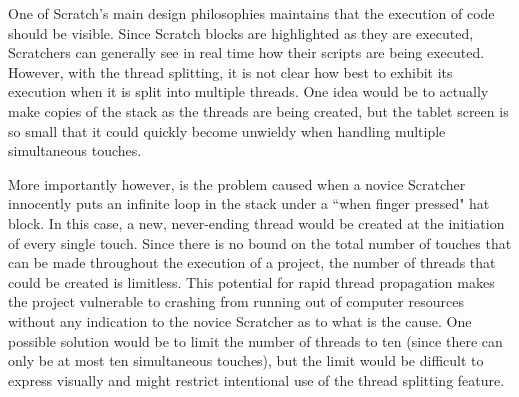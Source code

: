 One of Scratch's main design philosophies maintains that the execution of code should be visible. Since Scratch blocks are highlighted as they are executed, Scratchers can generally see in real time how their scripts are being executed. However, with the thread splitting, it is not clear how best to exhibit its execution when it is split into multiple threads. One idea would be to actually make copies of the stack as the threads are being created, but the tablet screen is so small that it could quickly become unwieldy when handling multiple simultaneous touches.

More importantly however, is the problem caused when a novice Scratcher innocently puts an infinite loop in the stack under a ``when finger pressed" hat block. In this case, a new, never-ending thread would be created at the initiation of every single touch. Since there is no bound on the total number of touches that can be made throughout the execution of a project, the number of threads that could be created is limitless. This potential for rapid thread propagation makes the project vulnerable to crashing from running out of computer resources without any indication to the novice Scratcher as to what is the cause. One possible solution would be to limit the number of threads to ten (since there can only be at most ten simultaneous touches), but the limit would be difficult to express visually and might restrict intentional use of the thread splitting feature.


